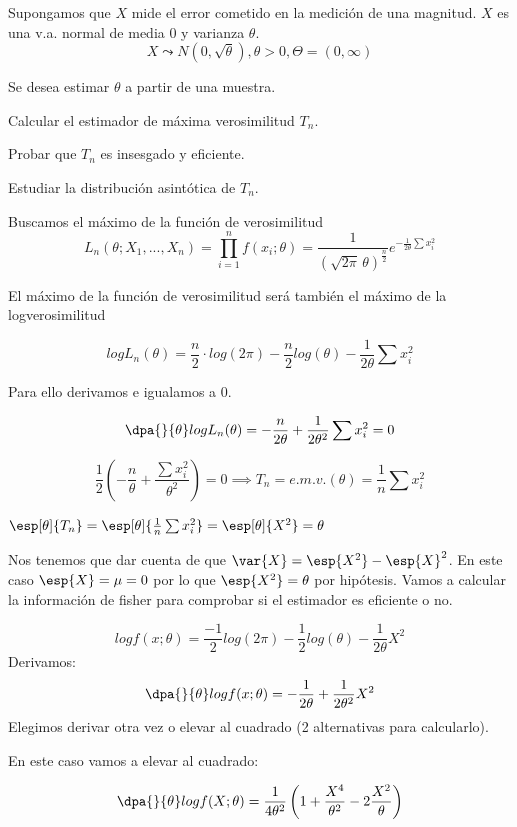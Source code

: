 \begin{problem}[2]
Supongamos que $X$ mide el error cometido en la medición de una magnitud. $X$ es una v.a. normal de media 0 y varianza $\theta$. 	
\[X\leadsto N(0,\sqrt{\theta}), \theta>0, \Theta = (0,\infty)\]

Se desea estimar $\theta$ a partir de una muestra.

\ppart Calcular el estimador de máxima verosimilitud $T_n$.

\ppart Probar que $T_n$ es insesgado y eficiente.

\ppart Estudiar la distribución asintótica de $T_n$.

\solution
\spart Buscamos el máximo de la función de verosimilitud
\[
L_n(\theta;X_1,...,X_n) =
\prod_{i=1}^n f(x_i;\theta) =
\frac{1}{(\sqrt{2\pi} \, \theta)^{\frac{n}{2}}} e ^ {-\frac{1}{2\theta} \sum x_i^2}
\]

El máximo de la función de verosimilitud será también el máximo de la logverosimilitud

\[logL_n(\theta) = \frac{n}{2}\cdot log(2\pi) - \frac{n}{2}log(\theta) - \frac{1}{2\theta} \sum x_i^2\]

Para ello derivamos e igualamos a 0.

\[\dpa{}{\theta} logL_n(\theta) = -\frac{n}{2\theta} + \frac{1}{2\theta^2}\sum x_i^2  = 0\]

\[\frac{1}{2}\left( - \frac{n}{\theta} + \frac{\sum x_i^2}{\theta^2}\right) = 0 \implies T_n = e.m.v.(\theta) = \frac{1}{n}\sum x_i^2\]


\spart $\esp[\theta]{T_n} = \esp[\theta]{\frac{1}{n}\sum x_i^2} = \esp[\theta]{X^2} = \theta$

Nos tenemos que dar cuenta de que $\var{X} = \esp{X^2} - \esp{X}^2$. En este caso $\esp{X} = \mu = 0$ por lo que $\esp{X^2} = \theta$ por hipótesis.
Vamos a calcular la información de fisher para comprobar si el estimador es eficiente o no.

\[ log f(x;\theta) = \frac{-1}{2}log(2\pi)-\frac{1}{2}log(\theta) - \frac{1}{2\theta}X^2\]
Derivamos:
\[\dpa{}{\theta} log f(x;\theta) = -\frac{1}{2\theta} + \frac{1}{2\theta^2}X^2\]
Elegimos derivar otra vez o elevar al cuadrado (2 alternativas para calcularlo).

En este caso vamos a elevar al cuadrado:

\[\dpa{}{\theta}logf(X;\theta) = \frac{1}{4\theta^2} \left( 1+\frac{X^4}{\theta^2} - 2\frac{X^2}{\theta}\right)\]


\end{problem}
